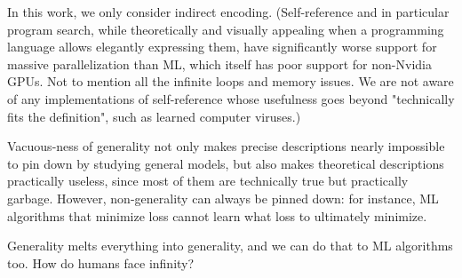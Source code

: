 \documentclass{article}
\begin{document}
In this work, we only consider indirect encoding. (Self-reference and in particular program search, while theoretically and visually appealing when a programming language allows elegantly expressing them, have significantly worse support for massive parallelization than ML, which itself has poor support for non-Nvidia GPUs. Not to mention all the infinite loops and memory issues. We are not aware of any implementations of self-reference whose usefulness goes beyond "technically fits the definition", such as learned computer viruses.)

Vacuous-ness of generality not only makes precise descriptions nearly impossible to pin down by studying general models, but also makes theoretical descriptions practically useless, since most of them are technically true but practically garbage. However, non-generality can always be pinned down: for instance, ML algorithms that minimize loss cannot learn what loss to ultimately minimize.

Generality melts everything into generality, and we can do that to ML algorithms too. How do humans face infinity?
\end{document}
